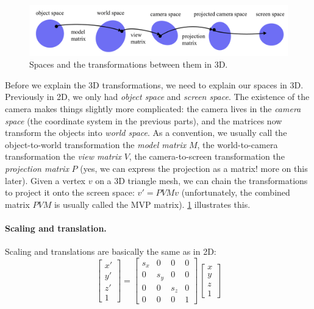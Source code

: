 \begin{figure}[h]
    \centering
    \includegraphics[width=0.8\linewidth]{imgs/3d_spaces.pdf}
    \caption{Spaces and the transformations between them in 3D.}
    \label{fig:3d_spaces}
\end{figure}

Before we explain the 3D transformations, we need to explain our spaces in 3D. Previously in 2D, we only had \emph{object space} and \emph{screen space}. The existence of the camera makes things slightly more complicated: the camera lives in the \emph{camera space} (the coordinate system in the previous parts), and the matrices now transform the objects into \emph{world space}. As a convention, we usually call the object-to-world transformation the \emph{model matrix} $M$, the world-to-camera transformation the \emph{view matrix} $V$, the camera-to-screen transformation the \emph{projection matrix} $P$ (yes, we can express the projection as a matrix! more on this later). Given a vertex $v$ on a 3D triangle mesh, we can chain the transformations to project it onto the screen space: $v'=PVMv$ (unfortunately, the combined matrix $PVM$ is usually called the MVP matrix). \cref{fig:3d_spaces} illustrates this.

\paragraph{Scaling and translation.} Scaling and translations are basically the same as in 2D:
\begin{equation}
\begin{bmatrix}
x' \\
y' \\
z' \\
1
\end{bmatrix}
=
\begin{bmatrix}
s_x & 0 & 0 & 0 \\
0 & s_y & 0 & 0 \\
0 & 0 & s_z & 0 \\
0 & 0 & 0 & 1
\end{bmatrix}
\begin{bmatrix}
x \\
y \\
z \\
1
\end{bmatrix}
\end{equation}

